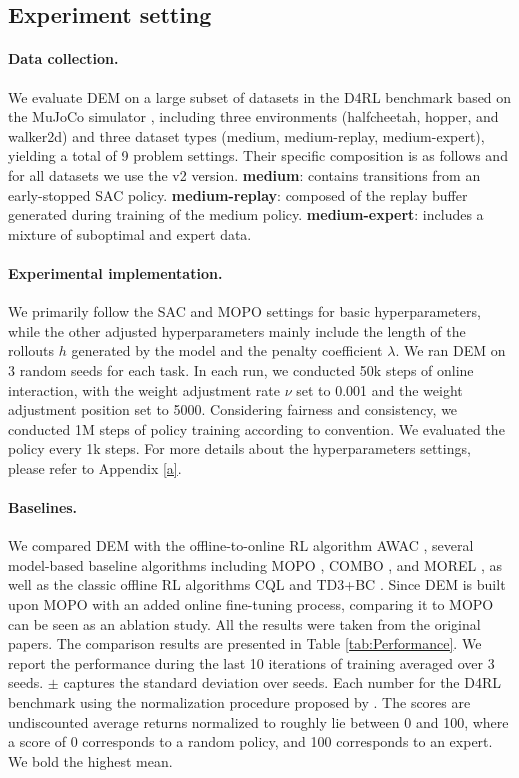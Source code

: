 \documentclass[conference]{IEEEtran}
\begin{document}
\subsection{Experiment setting}
\paragraph{Data collection.} We evaluate DEM on a large subset of datasets in the D4RL benchmark \cite{d4rl} based on the MuJoCo simulator \cite{mujoco}, including three environments (halfcheetah, hopper, and walker2d) and three dataset types (medium, medium-replay, medium-expert), yielding a total of 9 problem settings. Their specific composition is as follows and for all datasets we use the v2 version. \textbf{medium}: contains transitions from an early-stopped SAC policy. \textbf{medium-replay}: composed of the replay buffer generated during training of the medium policy. \textbf{medium-expert}: includes a mixture of suboptimal and expert data.

\paragraph{Experimental implementation.} We primarily follow the SAC \cite{sac} and MOPO \cite{mopo} settings for basic hyperparameters, while the other adjusted hyperparameters mainly include the length of the rollouts $h$ generated by the model and the penalty coefficient $\lambda$. We ran DEM on 3 random seeds for each task. In each run, we conducted 50k steps of online interaction, with the weight adjustment rate $\nu$ set to 0.001 and the weight adjustment position set to 5000. Considering fairness and consistency, we conducted 1M steps of policy training according to convention. We evaluated the policy every 1k steps. For more details about the hyperparameters settings, please refer to Appendix \ref{a}.

\paragraph{Baselines.} We compared DEM with the offline-to-online RL algorithm AWAC \cite{awac}, several model-based baseline algorithms including MOPO \cite{mopo}, COMBO \cite{combo}, and MOREL \cite{morel}, as well as the classic offline RL algorithms CQL \cite{cql} and TD3+BC \cite{minimalist}. Since DEM is built upon MOPO with an added online fine-tuning process, comparing it to MOPO can be seen as an ablation study. All the results were taken from the original papers. The comparison results are presented in Table \ref{tab:Performance}. We report the performance during the last 10 iterations of training averaged over 3 seeds. $\pm$ captures the standard deviation over seeds. Each number for the D4RL benchmark using the normalization procedure proposed by \cite{d4rl}. The scores are undiscounted average returns normalized to roughly lie between 0 and 100, where a score of 0 corresponds to a random policy, and 100 corresponds to an expert. We bold the highest mean.
\end{document}
